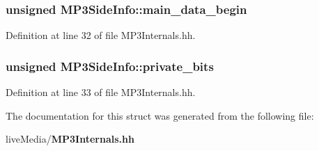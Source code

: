 \subsubsection[{main\+\_\+data\+\_\+begin}]{\setlength{\rightskip}{0pt plus 5cm}unsigned M\+P3\+Side\+Info\+::main\+\_\+data\+\_\+begin}\label{structMP3SideInfo_aa239bb9109a972e4ca27ff9545a6d102}


Definition at line 32 of file M\+P3\+Internals.\+hh.

\subsubsection[{private\+\_\+bits}]{\setlength{\rightskip}{0pt plus 5cm}unsigned M\+P3\+Side\+Info\+::private\+\_\+bits}\label{structMP3SideInfo_a5fad7233cfc76741616d8cda7acddab2}


Definition at line 33 of file M\+P3\+Internals.\+hh.



The documentation for this struct was generated from the following file\+:\begin{DoxyCompactItemize}
\item 
live\+Media/{\bf M\+P3\+Internals.\+hh}\end{DoxyCompactItemize}
